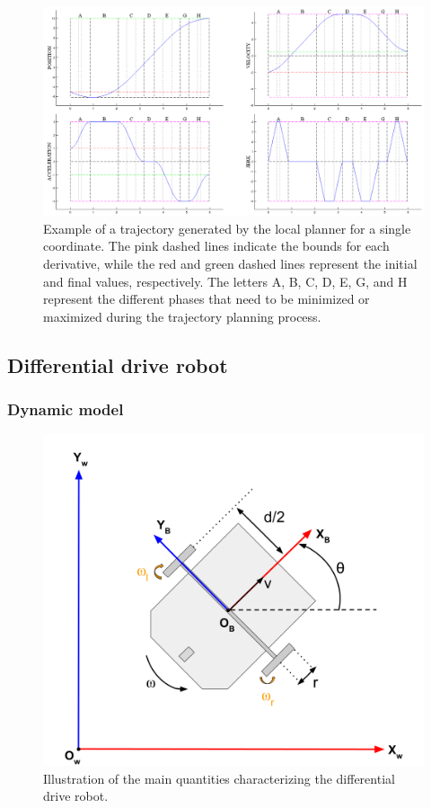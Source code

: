 \begin{figure} [t]
  \centering
  \includegraphics[width=0.99\linewidth]{figures/models/kino.png} 
  \caption{Example of a trajectory generated by the local planner for a single coordinate. The pink dashed lines indicate the bounds for each derivative, while the red and green dashed lines represent the initial and final values, respectively. 
  The letters A, B, C, D, E, G, and H represent the different phases that need to be minimized or maximized during the trajectory planning process.}%
  \label{fig:kino}%
\end{figure}

\subsection{Differential drive robot}

\subsubsection{Dynamic model}

\begin{figure} [t]
  \centering
  \includegraphics[width=0.6\linewidth]{figures/models/unicycle.png} 
  \caption{Illustration of the main quantities characterizing the differential drive robot.}%
  \label{fig:unicycle}%
\end{figure}

